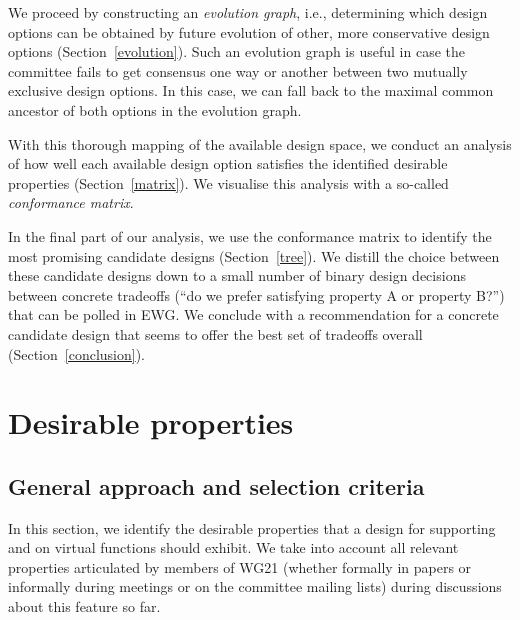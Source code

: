 We proceed by constructing an \emph{evolution graph}, i.e., determining which design options can be obtained by future evolution of other, more conservative design options (Section~\ref{evolution}). Such an evolution graph is useful in case the committee fails to get consensus one way or another between two mutually exclusive design options. In this case, we can fall back to the maximal common ancestor of both options in the evolution graph.

With this thorough mapping of the available design space, we conduct an analysis of how well each available design option satisfies the identified desirable properties (Section~\ref{matrix}). We visualise this analysis with a so-called \emph{conformance matrix}. 

In the final part of our analysis, we use the conformance matrix to identify the most promising candidate designs (Section~\ref{tree}). We distill the choice between these candidate designs down to a small number of binary design decisions between concrete tradeoffs (``do we prefer satisfying property A or property B?'') that can be polled in EWG. We conclude with a recommendation for a concrete candidate design that seems to offer the best set of tradeoffs overall (Section~\ref{conclusion}).


\section{Desirable properties}
\label{properties}



\subsection{General approach and selection criteria}

In this section, we identify the desirable properties that a design for supporting  and  on virtual functions should exhibit. We take into account all relevant properties articulated by members of WG21 (whether formally in papers or informally during meetings or on the committee mailing lists)  during discussions about this feature so far.


